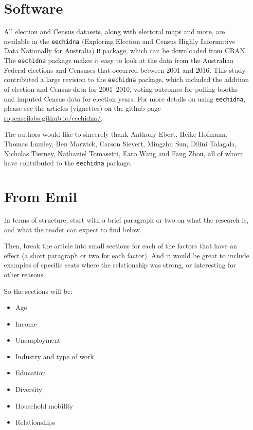 \documentclass[11pt,a4paper,]{article}
\providecommand{\tightlist}{%
  \setlength{\itemsep}{0pt}\setlength{\parskip}{0pt}}
\begin{document}
\hypertarget{software}{%
\section{Software}\label{software}}

All election and Census datasets, along with electoral maps and more, are available in the \texttt{eechidna} (Exploring Election and Census Highly Informative Data Nationally for Australia) \texttt{R} package, which can be downloaded from CRAN. The \texttt{eechidna} package makes it easy to look at the data from the Australian Federal elections and Censuses that occurred between 2001 and 2016. This study contributed a large revision to the \texttt{eechidna} package, which included the addition of election and Census data for 2001--2010, voting outcomes for polling booths and imputed Census data for election years. For more details on using \texttt{eechidna}, please see the articles (vignettes) on the github page \href{https://ropenscilabs.github.io/eechidna/}{ropenscilabs.github.io/eechidna/}.

The authors would like to sincerely thank Anthony Ebert, Heike Hofmann, Thomas Lumley, Ben Marwick, Carson Sievert, Mingzhu Sun, Dilini Talagala, Nicholas Tierney, Nathaniel Tomasetti, Earo Wang and Fang Zhou, all of whom have contributed to the \texttt{eechidna} package.

\hypertarget{from-emil}{%
\section{From Emil}\label{from-emil}}

In terms of structure, start with a brief paragraph or two on what the research is, and what the reader can expect to find below.

Then, break the article into small sections for each of the factors that have an effect (a short paragraph or two for each factor). And it would be great to include examples of specific seats where the relationship was strong, or interesting for other reasons.

So the sections will be:

\begin{itemize}
\tightlist
\item
  Age
\item
  Income
\item
  Unemployment
\item
  Industry and type of work
\item
  Education
\item
  Diversity
\item
  Household mobility
\item
  Relationships
\end{itemize}
\end{document}
